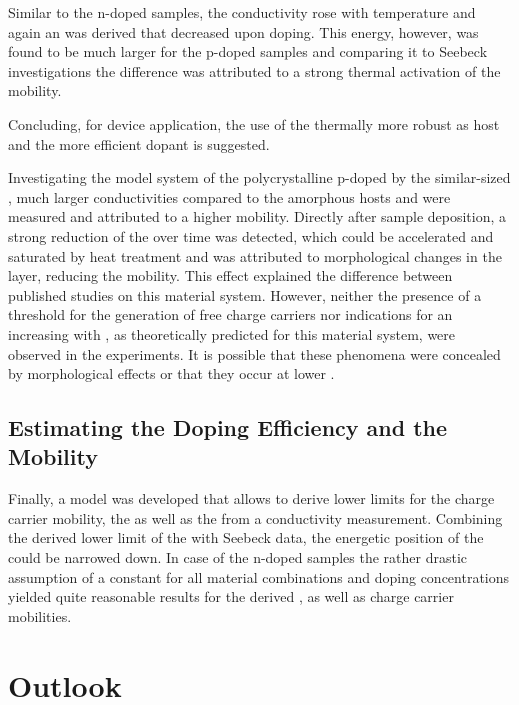 Similar to the n-doped samples, the conductivity rose with temperature and again an \EactLongL was derived that decreased upon doping. This energy, however, was found to be much larger for the p-doped samples and comparing it to Seebeck investigations the difference was attributed to a strong thermal activation of the mobility.

Concluding, for device application, the use of the thermally more robust \lili as host and the more efficient dopant \FS is suggested.

Investigating the model system of the polycrystalline \pen p-doped by the similar-sized \FV, much larger conductivities compared to the amorphous hosts \meo and \lili were measured and attributed to a higher mobility.
Directly after sample deposition, a strong reduction of the \insitu \cLong over time was detected, which could be accelerated and saturated by heat treatment and was attributed to morphological changes in the layer, reducing the mobility. This effect explained the difference between published studies on this material system.
However, neither the presence of a threshold \CLong for the generation of free charge carriers nor indications for an increasing \DopEffLong with \CLong, as theoretically predicted for this material system, were observed in the experiments.
It is possible that these phenomena were concealed by morphological effects or that they occur at lower \CLongs.

\subsection*{Estimating the Doping Efficiency and the Mobility}
Finally, a model was developed that allows to derive lower limits for the charge carrier mobility, the \nLong as well as the \DopEffLong from a conductivity measurement.
Combining the derived lower limit of the \DopEffLong with Seebeck data, the energetic position of the \EtLong could be narrowed down.
In case of the n-doped \CS samples the rather drastic assumption of a constant \EtLong for all material combinations and doping concentrations yielded quite reasonable results for the derived \neLongs, \DopEffLongs as well as charge carrier mobilities.

\section{Outlook}

